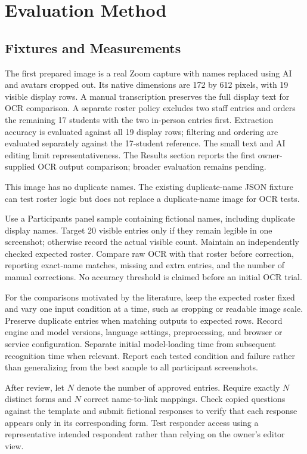 \section{Evaluation Method}
\subsection{Fixtures and Measurements}
The first prepared image is a real Zoom capture with names replaced using AI
and avatars cropped out. Its native dimensions are 172 by 612 pixels, with
19 visible display rows. A manual transcription preserves the full display text
for OCR comparison. A separate roster policy excludes two staff entries and
orders the remaining 17 students with the two in-person entries first.
Extraction accuracy is evaluated against all 19 display rows; filtering and
ordering are evaluated separately against the 17-student reference. The small
text and AI editing limit representativeness. The Results section reports the
first owner-supplied OCR output comparison; broader evaluation remains pending.

This image has no duplicate names. The existing duplicate-name JSON fixture
can test roster logic but does not replace a duplicate-name image for OCR tests.

Use a Participants panel sample containing fictional names, including duplicate
display names. Target 20 visible entries only if they remain legible in one
screenshot; otherwise record the actual visible count. Maintain an independently
checked expected roster. Compare raw OCR with that roster before correction,
reporting exact-name matches, missing and extra entries, and the number of manual
corrections. No accuracy threshold is claimed before an initial OCR trial.

For the comparisons motivated by the literature, keep the expected roster fixed
and vary one input condition at a time, such as cropping or readable image scale.
Preserve duplicate entries when matching outputs to expected rows. Record engine
and model versions, language settings, preprocessing, and browser or service
configuration. Separate initial model-loading time from subsequent recognition
time when relevant. Report each tested condition and failure rather than
generalizing from the best sample to all participant screenshots.

After review, let $N$ denote the number of approved entries. Require exactly
$N$ distinct forms and $N$ correct name-to-link mappings. Check copied questions
against the template and submit fictional responses to verify that each response
appears only in its corresponding form. Test responder access using a
representative intended respondent rather than relying on the owner's editor view.

